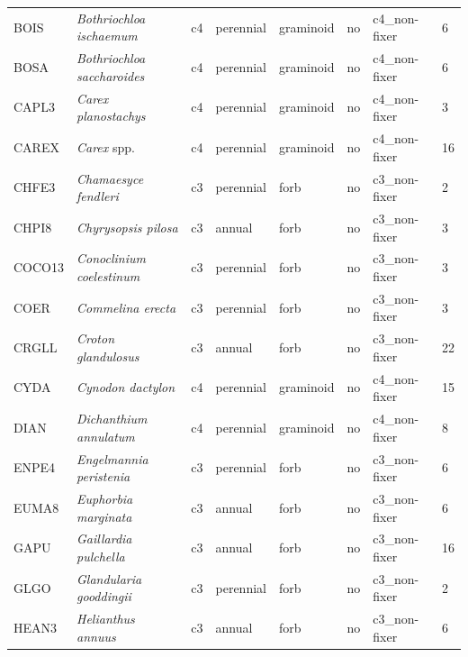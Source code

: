 \begin{landscape}
\begin{table}[]
{\begin{tabular}{p{2cm}p{5cm}p{2cm}p{2cm}p{2cm}p{2cm}p{3.5cm}p{2cm}}
            BOIS   & \textit{Bothriochloa ischaemum}    & c4 & perennial & graminoid      & no  & c4\_non-fixer & 6  \\
            BOSA   & \textit{Bothriochloa saccharoides} & c4 & perennial & graminoid      & no  & c4\_non-fixer & 6  \\
            CAPL3  & \textit{Carex planostachys}        & c4 & perennial & graminoid      & no  & c4\_non-fixer & 3  \\
            CAREX  & \textit{Carex} spp.                & c4 & perennial & graminoid      & no  & c4\_non-fixer & 16 \\
            CHFE3  & \textit{Chamaesyce fendleri}       & c3 & perennial & forb           & no  & c3\_non-fixer & 2  \\
            CHPI8  & \textit{Chyrysopsis pilosa}        & c3 & annual    & forb           & no  & c3\_non-fixer & 3  \\
            COCO13 & \textit{Conoclinium coelestinum}   & c3 & perennial & forb           & no  & c3\_non-fixer & 3  \\
            COER   & \textit{Commelina erecta}          & c3 & perennial & forb           & no  & c3\_non-fixer & 3  \\
            CRGLL  & \textit{Croton glandulosus}        & c3 & annual    & forb           & no  & c3\_non-fixer & 22 \\
            CYDA   & \textit{Cynodon dactylon}          & c4 & perennial & graminoid      & no  & c4\_non-fixer & 15 \\
            DIAN   & \textit{Dichanthium annulatum}     & c4 & perennial & graminoid      & no  & c4\_non-fixer & 8  \\
            ENPE4  & \textit{Engelmannia peristenia}    & c3 & perennial & forb           & no  & c3\_non-fixer & 6  \\
            EUMA8  & \textit{Euphorbia marginata}       & c3 & annual    & forb           & no  & c3\_non-fixer & 6  \\
            GAPU   & \textit{Gaillardia pulchella}      & c3 & annual    & forb           & no  & c3\_non-fixer & 16 \\
            GLGO   & \textit{Glandularia gooddingii}    & c3 & perennial & forb           & no  & c3\_non-fixer & 2  \\
            HEAN3  & \textit{Helianthus annuus}         & c3 & annual    & forb           & no  & c3\_non-fixer & 6  \\
            \hline
        \end{tabular}}
    \end{table}
\end{landscape}
\clearpage

